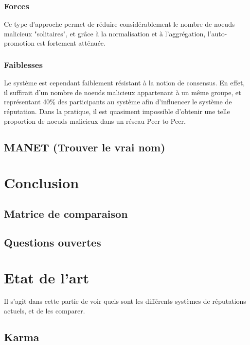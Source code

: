 \documentclass[a4paper, 11pt]{article} %
\begin{document}
\subsubsection{Forces}
Ce type d'approche permet de réduire considérablement le nombre de noeuds malicieux "solitaires", et grâce à la normalisation et à l'aggrégation, l'auto-promotion est fortement atténuée.

\subsubsection{Faiblesses}
Le système est cependant faiblement résistant à la notion de consensus.
En effet, il suffirait d'un nombre de noeuds malicieux appartenant à un même groupe, et représentant 40\% des participants au système afin d'influencer le système de réputation.
Dans la pratique, il est quasiment impossible d'obtenir une telle proportion de noeuds malicieux dans un réseau Peer to Peer.

\subsection{MANET (Trouver le vrai nom)}

\section{Conclusion}
\subsection{Matrice de comparaison}
\subsection{Questions ouvertes}

\section{Etat de l'art}
Il s'agit dans cette partie de voir quels sont les différents systèmes de réputations actuels, et de les comparer.


\subsection{Karma}
\end{document}
